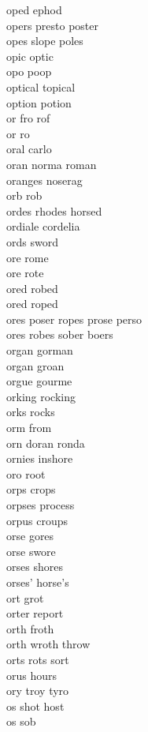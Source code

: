 oped ephod \\
opers presto poster \\
opes slope poles \\
opic optic \\
opo poop \\
optical topical\\
option potion\\
or fro rof \\
or ro\\
oral carlo \\
oran norma roman \\
oranges noserag\\
orb rob\\
ordes rhodes horsed \\
ordiale cordelia \\
ords sword \\
ore rome \\
ore rote \\
ored robed \\
ored roped \\
ores poser ropes prose perso \\
ores robes sober boers \\
organ gorman \\
organ groan\\
orgue gourme \\
orking rocking \\
orks rocks \\
orm from \\
orn doran ronda  \\
ornies inshore \\
oro root \\
orps crops \\
orpses process \\
orpus croups \\
orse gores \\
orse swore \\
orses shores \\
orses' horse's \\
ort grot \\
orter report \\
orth froth \\
orth wroth throw \\
orts rots sort\\
orus hours \\
ory troy tyro \\
os shot host  \\
os sob \\

